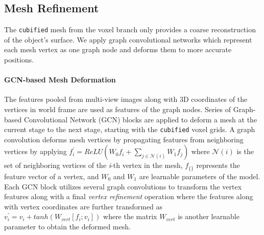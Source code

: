 
\subsection{Mesh Refinement}
\label{subsec:mesh_refinement}
The \texttt{cubified} mesh from the voxel branch only provides a coarse reconstruction of the object's surface. We apply graph convolutional networks which represent each mesh vertex as one graph node and deforms them to more accurate positions.

\paragraph{GCN-based Mesh Deformation}
The features pooled from multi-view images along with 3D coordinates of the vertices in world frame are used as features of the graph nodes.
Series of Graph-based Convolutional Network (GCN) blocks are applied to deform a mesh at the current stage to the next stage, starting with the \texttt{cubified} voxel grids.
A graph convolution deforms mesh vertices by propagating features from neighboring vertices by applying
$f_{i}^{'} = ReLU(W_0f_i + \sum_{j \in \mathcal{N}(i)} W_1 f_j)$ where $\mathcal{N}(i)$ is the set of neighboring vertices of the \emph{i}-th vertex in the mesh, $f_{\{\}}$ represents the feature vector of a vertex, and $W_0$ and $W_1$ are learnable parameters of the model.
Each GCN block utilizes several graph convolutions to transform the vertex features along with a final \emph{vertex refinement} operation where the features along with vertex coordinates are further transformed as $v_i^{'} = v_i + tanh(W_{vert}[f_i;v_i])$ where the matrix $W_{vert}$ is another learnable parameter to obtain the deformed mesh.

\label{subsec:contrastive_depth_feature_extraction}
